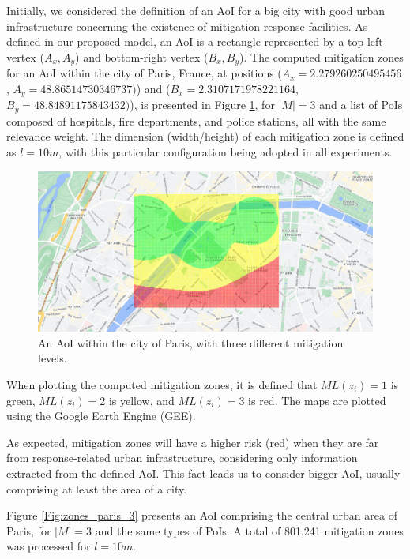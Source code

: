 \begin{refsection}
Initially, we considered the definition of an AoI for a big city with good urban infrastructure concerning the existence of mitigation response facilities. As defined in our proposed model, an AoI is a rectangle represented by a top-left vertex ($A_x,A_y$) and bottom-right vertex ($B_x,B_y$). The computed mitigation zones for an AoI within the city of Paris, France, at positions ($A_x = 2.279260250495456$, $A_y = 48.86514730346737)$) and ($B_x = 2.3107171978221164$, $B_y = 48.84891175843432)$), is presented in Figure \ref{Fig:zones_paris_0}, for $|M|=3$ and a list of PoIs composed of hospitals, fire departments, and police stations, all with the same relevance weight. The dimension (width/height) of each mitigation zone is defined as $l = 10m$, with this particular configuration being adopted in all experiments.

\begin{figure}[ht!]
  \centering
  \includegraphics[width=0.9\linewidth]{Chapters/2-EDUs/images/eiffel_M3.png}
  \caption{An AoI within the city of Paris, with three different mitigation levels.}\label{Fig:zones_paris_0}
\end{figure}

When plotting the computed mitigation zones, it is defined that $ML(z_i)=1$ is green, $ML(z_i)=2$ is yellow, and $ML(z_i)=3$ is red. The maps are plotted using the Google Earth Engine (GEE).

As expected, mitigation zones will have a higher risk (red) when they are far from response-related urban infrastructure, considering only information extracted from the defined AoI. This fact leads us to consider bigger AoI, usually comprising at least the area of a city.

Figure \ref{Fig:zones_paris_3} presents an AoI comprising the central urban area of Paris, for $|M|=3$ and the same types of PoIs. A total of 801,241 mitigation zones was processed for $l = 10m$.


\end{refsection}
